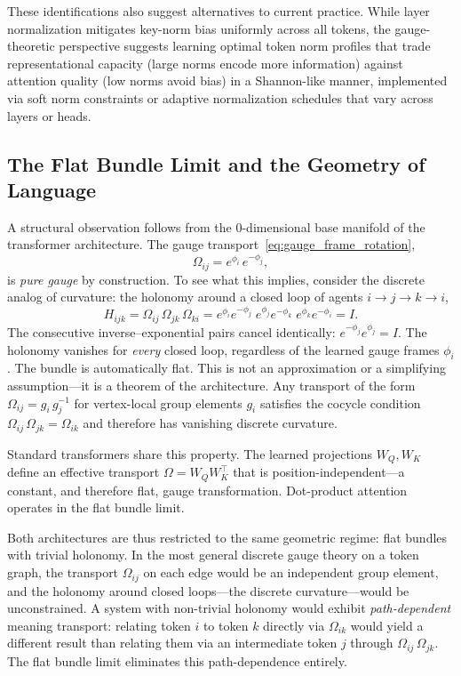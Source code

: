 \documentclass[twoside,11pt]{article}
\begin{document}
These identifications also suggest alternatives to current practice. While layer normalization mitigates key-norm bias uniformly across all tokens, the gauge-theoretic perspective suggests learning optimal token norm profiles that trade representational capacity (large norms encode more information) against attention quality (low norms avoid bias) in a Shannon-like manner, implemented via soft norm constraints or adaptive normalization schedules that vary across layers or heads.

\subsection{The Flat Bundle Limit and the Geometry of Language}
\label{sec:flat_bundle}

A structural observation follows from the 0-dimensional base manifold of the transformer architecture. The gauge transport~\eqref{eq:gauge_frame_rotation},
\begin{equation}
\Omega_{ij} = e^{\phi_i}\,e^{-\phi_j},
\end{equation}
is \emph{pure gauge} by construction. To see what this implies, consider the discrete analog of curvature: the holonomy around a closed loop of agents $i \to j \to k \to i$,
\begin{equation}
H_{ijk} = \Omega_{ij}\,\Omega_{jk}\,\Omega_{ki}
= e^{\phi_i}e^{-\phi_j}\;e^{\phi_j}e^{-\phi_k}\;e^{\phi_k}e^{-\phi_i}
= I.
\label{eq:holonomy}
\end{equation}
The consecutive inverse--exponential pairs cancel identically: $e^{-\phi_j}e^{\phi_j} = I$. The holonomy vanishes for \emph{every} closed loop, regardless of the learned gauge frames $\phi_i$. The bundle is automatically flat. This is not an approximation or a simplifying assumption---it is a theorem of the architecture. Any transport of the form $\Omega_{ij} = g_i\,g_j^{-1}$ for vertex-local group elements $g_i$ satisfies the cocycle condition $\Omega_{ij}\,\Omega_{jk} = \Omega_{ik}$ and therefore has vanishing discrete curvature.

Standard transformers share this property. The learned projections $W_Q, W_K$ define an effective transport $\Omega = W_Q W_K^\top$ that is position-independent---a constant, and therefore flat, gauge transformation. Dot-product attention operates in the flat bundle limit.

Both architectures are thus restricted to the same geometric regime: flat bundles with trivial holonomy. In the most general discrete gauge theory on a token graph, the transport $\Omega_{ij}$ on each edge would be an independent group element, and the holonomy around closed loops---the discrete curvature---would be unconstrained. A system with non-trivial holonomy would exhibit \emph{path-dependent} meaning transport: relating token $i$ to token $k$ directly via $\Omega_{ik}$ would yield a different result than relating them via an intermediate token $j$ through $\Omega_{ij}\,\Omega_{jk}$. The flat bundle limit eliminates this path-dependence entirely.
\end{document}
